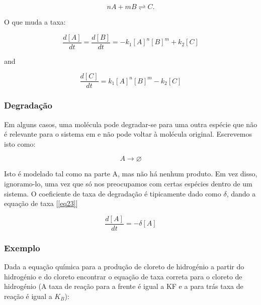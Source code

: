 \documentclass[11pt, letterpaper, portuguese]{article}
\begin{document}
    \begin{equation}
        nA+mB \rightleftharpoons C.
    \end{equation}

    \par{O que muda a taxa: }

    \begin{equation}
        \frac{d [A]}{d t}=\frac{d [B]}{d t}=-k_1{[A]}^n[B]^m+k_2[C]
    \end{equation}

    \par{and}

    \begin{equation}
        \frac{d [C]}{d t}=k_1[A]^n[B]^m-k_2[C]
    \end{equation}


    \subsubsection{Degradação}

    \par{Em alguns casos, uma molécula pode degradar-se para uma outra espécie que não é relevante para o sistema em e não pode voltar à molécula original. Escrevemos isto como:}
    
    \begin{equation}
        A \longrightarrow  \varnothing
    \end{equation}
    \par{Isto é modelado tal como na parte A, mas não há nenhum produto. Em vez disso, ignoramo-lo, uma vez que só nos preocupamos com certas espécies dentro de um sistema. O coeficiente de taxa de degradação é tipicamente dado como $\delta$, dando a equação de taxa [\ref{eq23}]}
    
    \begin{equation}
        \frac{d [A]}{d t}=-\delta[A]
        \label{eq23}
    \end{equation}
    
    
    \subsubsection{Exemplo}
    
    \par{Dada a equação química para a produção de cloreto de hidrogénio a partir do hidrogénio e do cloreto encontrar o equação de taxa correta para o cloreto de hidrogénio (A taxa de reação para a frente é igual a KF e a para trás taxa de reação é igual a $K_B$): }
    
\end{document}
